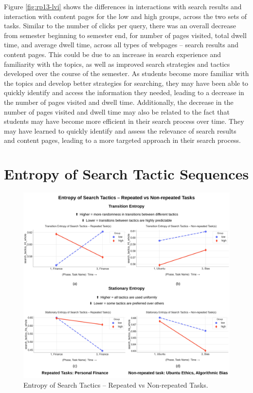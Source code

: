\documentclass[letterpaper, nobind]{templates/ociamthesis}
\begin{document}
Figure \ref{fig:rp13-lvi} shows the differences in interactions with search results and interaction with content pages for the low and high groups, across the two sets of tasks.
Similar to the number of clicks per query, there was an overall decrease from semester beginning to semester end, for number of pages visited, total dwell time, and average dwell time, across all types of webpages -- search results and content pages.
This could be due to an increase in search experience and familiarity with the topics, as well as improved search strategies and tactics developed over the course of the semester. As students become more familiar with the topics and develop better strategies for searching, they may have been able to quickly identify and access the information they needed, leading to a decrease in the number of pages visited and dwell time.
Additionally, the decrease in the number of pages visited and dwell time may also be related to the fact that students may have become more efficient in their search process over time. They may have learned to quickly identify and assess the relevance of search results and content pages, leading to a more targeted approach in their search process.

\hypertarget{entropy-of-search-tactic-sequences-1}{%
\section{Entropy of Search Tactic Sequences}\label{entropy-of-search-tactic-sequences-1}}

\begin{figure}

{\centering \includegraphics[width=1\linewidth]{figs/rp13-tactic-entropy} 

}

\caption[Entropy of Search Tactics -- Repeated vs Non-repeated Tasks.]{Entropy of Search Tactics -- Repeated vs Non-repeated Tasks.}\label{fig:rp13-tactic-entropy}
\end{figure}
\end{document}
